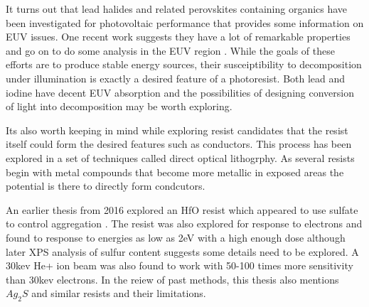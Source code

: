 It turns out that lead halides and related perovskites containing
organics have been investigated for photovoltaic performance
that provides some information on EUV issues.
One recent work suggests they have a lot of remarkable
properties  and go on to do some analysis in the EUV region
\cite{Green_Jiang_Soufiani_Optical_Properties_Photovoltaic_2015}.
While the goals of these efforts are to produce stable energy
sources, their susceiptibility to decomposition under illumination
is exactly a desired feature of a photoresist. 
Both lead and iodine have decent EUV absorption and the possibilities
of designing conversion of light into decomposition may be worth
exploring. 

Its also worth keeping in mind while exploring resist candidates that
the resist itself could form the desired features such as conductors.
This process has been explored in a set of techniques called direct
optical lithogrphy\cite{D4TA06618A}. As several resists begin with
metal compounds that become more metallic in exposed areas the
potential is there to directly form condcutors.  

An earlier thesis from 2016 explored an HfO resist which appeared
to use sulfate to control aggregation 
\cite{Luo_Deposition_characterization_patterning_2016}.
The resist was also explored for response to electrons and found
to response to energies as low as 2eV with a high enough dose
although later XPS analysis of sulfur content suggests some details
need to be explored.
A 30kev He+ ion beam was also found to work with 50-100 times
more sensitivity than 30kev electrons. In the reiew of past methods,
this thesis also mentions $Ag_2S$ and similar resists and their
limitations.  




